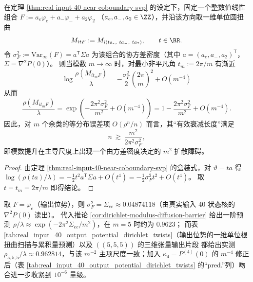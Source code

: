 \begin{corollary}\label{cor:dirichlet-modulus-diffusion-barrier}
在定理 \ref{thm:real-input-40-near-coboundary-svp} 的设定下，固定一个整数值线性组合
\(
F:=a_e\varphi_e+a_-\varphi_-+a_2\varphi_2
\)
（\(a_e,a_-,a_2\in\ZZ\)），并沿该方向取一维单位圆扭曲
\[
M_{itF}:=M_{i(t a_e,\ t a_-,\ t a_2)},\qquad t\in\RR.
\]
令
\(
\sigma_F^2:=\mathrm{Var}_\infty(F)=a^{\mathsf T}\Sigma a
\)
为该组合的协方差密度（其中 \(a=(a_e,a_-,a_2)^{\mathsf T}\)，\(\Sigma=\nabla^2P(0)\)）。
则当模数 \(m\to\infty\) 时，对最小非平凡角 \(t_m:=2\pi/m\) 有渐近
\[
\boxed{\;
\log\frac{\rho(M_{it_mF})}{\lambda}
=-\frac{\sigma_F^2}{2}\left(\frac{2\pi}{m}\right)^2+O(m^{-4})
\;}
\]
从而
\[
\boxed{\;
\frac{\rho(M_{it_mF})}{\lambda}
=\exp\!\left(-\frac{2\pi^2\sigma_F^2}{m^2}+O(m^{-4})\right)
=1-\frac{2\pi^2\sigma_F^2}{m^2}+O(m^{-4}).
\;}
\]
因此，对 \(m\) 个余类的等分布误差项 \(O(\rho^n/n)\) 而言，其“有效衰减长度”满足
\[
n\ \gtrsim\ \frac{m^2}{2\pi^2\sigma_F^2},
\]
即模数提升在主导尺度上出现一个由方差密度决定的 \(m^2\) 扩散障碍。
\end{corollary}

\begin{proof}
由定理 \ref{thm:real-input-40-near-coboundary-svp} 的盒装式，对 \(\vartheta=t a\) 得
\(
\log(\rho(ta)/\lambda)=-\frac12 t^2 a^{\mathsf T}\Sigma a+O(t^4)
=-\frac12\sigma_F^2 t^2+O(t^4)
\)。
取 \(t=t_m=2\pi/m\) 即得结论。
\end{proof}

\begin{remark}[数值闭环：输出位势的 \texorpdfstring{$m=5$}{m=5} 最坏比值]
取 \(F=\varphi_e\)（输出位势），则 \(\sigma_F^2=\Sigma_{ee}\approx 0.04874118\)（由真实输入 40 状态核的 \(\nabla^2P(0)\) 读出）。
代入推论 \ref{cor:dirichlet-modulus-diffusion-barrier} 给出一阶预测
\(
\rho/\lambda\approx \exp(-2\pi^2\Sigma_{ee}/m^2)
\)，在 \(m=5\) 时约为 \(0.9623\)；
而表 \ref{tab:real_input_40_output_potential_dirichlet_twists}（输出位势的一维单位根扭曲扫描与累积量预测）以及 \(((5,5,5))\) 的三维张量输出片段 \verb|| 都给出实测
\(
\rho_{5,5,5}/\lambda\approx 0.962814
\)，与该 \(m^{-2}\) 主项尺度一致；加入 \(\kappa_4=P^{(4)}(0)\) 的 \(m^{-4}\) 修正后（表 \ref{tab:real_input_40_output_potential_dirichlet_twists} 的“pred.”列）吻合进一步收紧到 \(10^{-6}\) 量级。
\end{remark}

